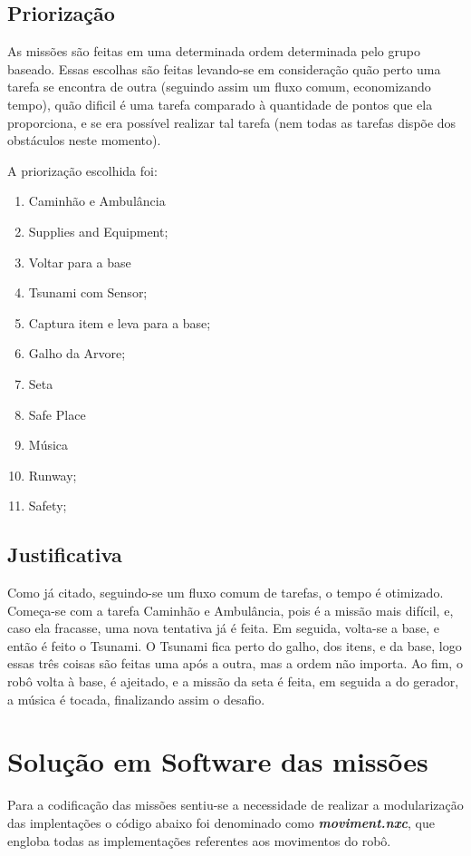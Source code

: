 \section{Priorização}

As missões são feitas em uma determinada ordem determinada pelo grupo baseado. Essas escolhas são feitas levando-se em consideração quão perto uma tarefa se encontra de outra (seguindo assim um fluxo comum, economizando tempo), quão dificil é uma tarefa comparado à quantidade de pontos que ela proporciona, e se era possível realizar tal tarefa (nem todas as tarefas dispõe dos obstáculos neste momento).

A priorização escolhida foi:

\begin{enumerate}
\item Caminhão e Ambulância
\item Supplies and Equipment;
\item Voltar para a base
\item Tsunami com Sensor;
\item Captura item e leva para a base;
\item Galho da Arvore;
\item Seta
\item Safe Place
\item Música
\item Runway;
\item Safety;
\end{enumerate}

\section{Justificativa}
Como já citado, seguindo-se um fluxo comum de tarefas, o tempo é otimizado. Começa-se com a tarefa Caminhão e Ambulância, pois é a missão mais difícil, e, caso ela fracasse, uma nova tentativa já é feita. Em seguida, volta-se a base, e então é feito o Tsunami. O Tsunami fica perto do galho, dos itens, e da base, logo essas três coisas são feitas uma após a outra, mas a ordem não importa. Ao fim, o robô volta à base, é ajeitado, e a missão da seta é feita, em seguida a do gerador, a música é tocada, finalizando assim o desafio.

\chapter{Solução em Software das missões}

Para a codificação das missões sentiu-se a necessidade de realizar a modularização das implentações o código abaixo foi denominado como \textbf{\textit{moviment.nxc}}, que engloba todas as implementações referentes aos movimentos do robô.

